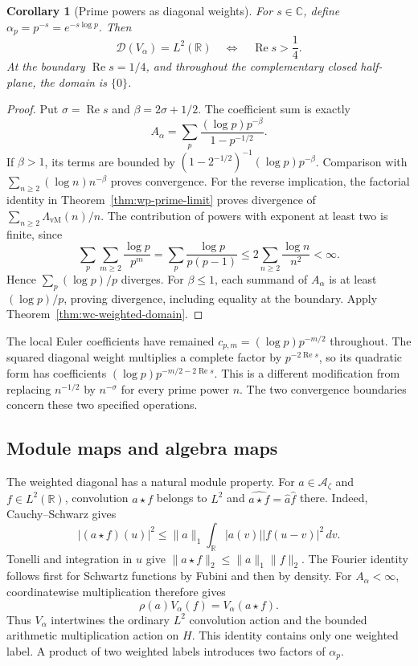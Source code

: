 \documentclass[11pt]{article}
\newtheorem{corollary}[theorem]{Corollary}
\theoremstyle{definition}
\theoremstyle{remark}
\numberwithin{equation}{section}
\newcommand{\cA}{\mathcal A}
\newcommand{\R}{\mathbb R}
\newcommand{\C}{\mathbb C}
\begin{document}
\begin{corollary}[Prime powers as diagonal weights]
\label{cor:wc-weighted-exponent}
For $s\in\C$, define $\alpha_p=p^{-s}=e^{-s\log p}$.
Then
\[
 \mathcal D(V_\alpha)=L^2(\R)
 \quad\Longleftrightarrow\quad\operatorname{Re}s>\frac14.
\]
At the boundary $\operatorname{Re}s=1/4$, and throughout the complementary
closed half-plane, the domain is $\{0\}$.
\end{corollary}
\begin{proof}
Put $\sigma=\operatorname{Re}s$ and $\beta=2\sigma+1/2$.
The coefficient sum is exactly
\[
 A_\alpha=\sum_p\frac{(\log p)p^{-\beta}}{1-p^{-1/2}}.
\]
If $\beta>1$, its terms are bounded by
$(1-2^{-1/2})^{-1}(\log p)p^{-\beta}$.
Comparison with $\sum_{n\geq2}(\log n)n^{-\beta}$ proves convergence.
For the reverse implication, the factorial identity in
Theorem~\ref{thm:wp-prime-limit} proves divergence of
$\sum_{n\geq2}\Lambda_{\mathrm{vM}}(n)/n$.
The contribution of powers with exponent at least two is finite, since
\[
 \sum_p\sum_{m\geq2}\frac{\log p}{p^m}
 =\sum_p\frac{\log p}{p(p-1)}
 \leq2\sum_{n\geq2}\frac{\log n}{n^2}<\infty.
\]
Hence $\sum_p(\log p)/p$ diverges.
For $\beta\leq1$, each summand of $A_\alpha$ is at least
$(\log p)/p$, proving divergence, including equality at the boundary.
Apply Theorem~\ref{thm:wc-weighted-domain}.
\end{proof}

The local Euler coefficients have remained
$c_{p,m}=(\log p)p^{-m/2}$ throughout.
The squared diagonal weight multiplies a complete factor by
$p^{-2\operatorname{Re}s}$, so its quadratic form has coefficients
$(\log p)p^{-m/2-2\operatorname{Re}s}$.
This is a different modification from replacing $n^{-1/2}$ by
$n^{-\sigma}$ for every prime power $n$.
The two convergence boundaries concern these two specified operations.

\subsection{Module maps and algebra maps}

The weighted diagonal has a natural module property.
For $a\in\cA_\zeta$ and $f\in L^2(\R)$, convolution $a\star f$
belongs to $L^2$ and
$\widehat{a\star f}=\widehat a\widehat f$ there.
Indeed, Cauchy--Schwarz gives
\[
 |(a\star f)(u)|^2\leq\|a\|_1
                  \int_\R|a(v)||f(u-v)|^2\,dv.
\]
Tonelli and integration in $u$ give
$\|a\star f\|_2\leq\|a\|_1\|f\|_2$.
The Fourier identity follows first for Schwartz functions by Fubini
and then by density.
For $A_\alpha<\infty$, coordinatewise multiplication therefore gives
\begin{equation}
 \rho(a)V_\alpha(f)=V_\alpha(a\star f).
 \label{eq:wc-weighted-module}
\end{equation}
Thus $V_\alpha$ intertwines the ordinary $L^2$ convolution action and
the bounded arithmetic multiplication action on $H$.
This identity contains only one weighted label.
A product of two weighted labels introduces two factors of $\alpha_p$.
\end{document}
